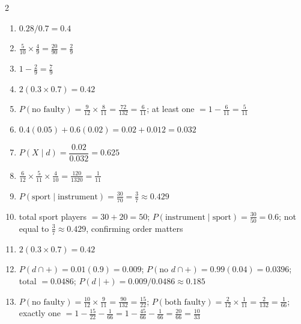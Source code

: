 \documentclass[11pt]{article}
\begin{document}
\begin{keybox}
\begin{multicols}{2}
\small
\begin{enumerate}[leftmargin=*,itemsep=3pt]
  \item $0.28/0.7=0.4$
  \item $\tfrac5{10}\times\tfrac49=\tfrac{20}{90}=\tfrac29$
  \item $1-\tfrac29=\tfrac79$
  \item $2(0.3\times0.7)=0.42$
  \item $P(\text{no faulty})=\tfrac9{12}\times\tfrac8{11}=\tfrac{72}{132}=\tfrac6{11}$; at least one $=1-\tfrac6{11}=\tfrac5{11}$
  \item $0.4(0.05)+0.6(0.02)=0.02+0.012=0.032$
  \item $P(X\mid d)=\dfrac{0.02}{0.032}=0.625$
  \item $\tfrac6{12}\times\tfrac5{11}\times\tfrac4{10}=\tfrac{120}{1320}=\tfrac1{11}$
  \item $P(\text{sport}\mid\text{instrument})=\tfrac{30}{70}=\tfrac37\approx0.429$
  \item total sport players $=30+20=50$; $P(\text{instrument}\mid\text{sport})=\tfrac{30}{50}=0.6$; not equal to $\tfrac37\approx0.429$, confirming order matters
  \item $2(0.3\times0.7)=0.42$
  \item $P(d\cap+)=0.01(0.9)=0.009$; $P(\text{no }d\cap+)=0.99(0.04)=0.0396$; total $=0.0486$; $P(d\mid+)=0.009/0.0486\approx0.185$
  \item $P(\text{no faulty})=\tfrac{10}{12}\times\tfrac9{11}=\tfrac{90}{132}=\tfrac{15}{22}$; $P(\text{both faulty})=\tfrac2{12}\times\tfrac1{11}=\tfrac2{132}=\tfrac1{66}$; exactly one $=1-\tfrac{15}{22}-\tfrac1{66}=1-\tfrac{45}{66}-\tfrac1{66}=\tfrac{20}{66}=\tfrac{10}{33}$
\end{enumerate}
\end{multicols}
\end{keybox}
\end{document}
